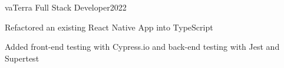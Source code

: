 \resumeSubheading
  {vaTerra}{}
  {Full Stack Developer}{2022}
  \vspace{\experienceItemSpacing}
  \resumeItemListStart
\item Refactored an existing React Native App into TypeScript
\item Added front-end testing with Cypress.io and back-end testing with Jest and Supertest
  \resumeItemListEnd 